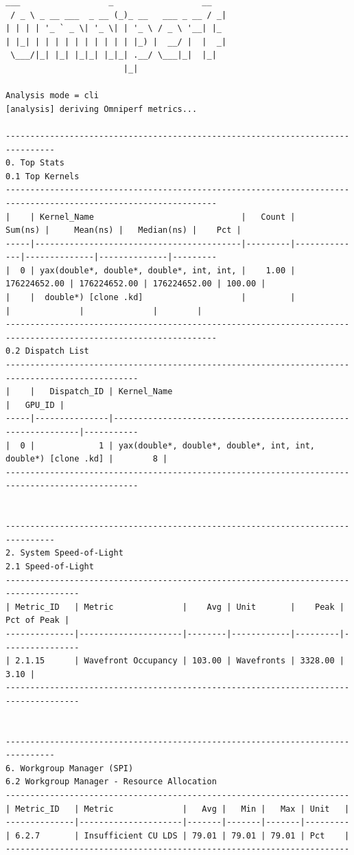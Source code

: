\documentclass[
]{article}
\begin{document}
\begin{Verbatim}[fontsize=\footnotesize]
  ___                  _                  __
 / _ \ _ __ ___  _ __ (_)_ __   ___ _ __ / _|
| | | | '_ ` _ \| '_ \| | '_ \ / _ \ '__| |_
| |_| | | | | | | | | | | |_) |  __/ |  |  _|
 \___/|_| |_| |_|_| |_|_| .__/ \___|_|  |_|
                        |_|

Analysis mode = cli
[analysis] deriving Omniperf metrics...

--------------------------------------------------------------------------------
0. Top Stats
0.1 Top Kernels
-----------------------------------------------------------------------------------------------------------------
|    | Kernel_Name                              |   Count |      Sum(ns) |     Mean(ns) |   Median(ns) |    Pct |
-----|------------------------------------------|---------|--------------|--------------|--------------|---------
|  0 | yax(double*, double*, double*, int, int, |    1.00 | 176224652.00 | 176224652.00 | 176224652.00 | 100.00 |
|    |  double*) [clone .kd]                    |         |              |              |              |        |
-----------------------------------------------------------------------------------------------------------------
0.2 Dispatch List
-------------------------------------------------------------------------------------------------
|    |   Dispatch_ID | Kernel_Name                                                   |   GPU_ID |
-----|---------------|---------------------------------------------------------------|-----------
|  0 |             1 | yax(double*, double*, double*, int, int, double*) [clone .kd] |        8 |
-------------------------------------------------------------------------------------------------


--------------------------------------------------------------------------------
2. System Speed-of-Light
2.1 Speed-of-Light
-------------------------------------------------------------------------------------
| Metric_ID   | Metric              |    Avg | Unit       |    Peak |   Pct of Peak |
--------------|---------------------|--------|------------|---------|----------------
| 2.1.15      | Wavefront Occupancy | 103.00 | Wavefronts | 3328.00 |          3.10 |
-------------------------------------------------------------------------------------


--------------------------------------------------------------------------------
6. Workgroup Manager (SPI)
6.2 Workgroup Manager - Resource Allocation
----------------------------------------------------------------------
| Metric_ID   | Metric              |   Avg |   Min |   Max | Unit   |
--------------|---------------------|-------|-------|-------|---------
| 6.2.7       | Insufficient CU LDS | 79.01 | 79.01 | 79.01 | Pct    |
----------------------------------------------------------------------
\end{Verbatim}
\end{document}
